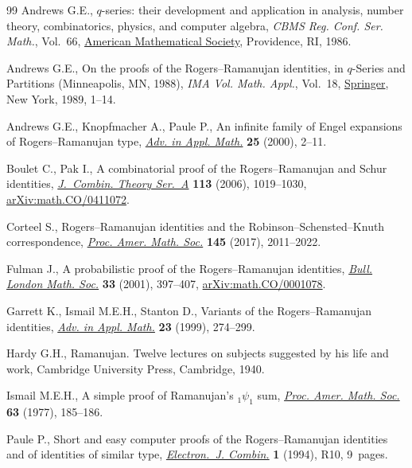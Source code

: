 \documentclass[11pt]{article}
\numberwithin{equation}{section}
\numberwithin{equation}{section}
\begin{document}
\begin{thebibliography}{99}
Andrews G.E., {$q$}-series: their development and application in analysis,
 number theory, combinatorics, physics, and computer algebra, \textit{CBMS
 Reg. Conf. Ser. Math.}, Vol.~66, \href{https://doi.org/10.1090/cbms/066}{American Mathematical Society}, Providence,
 RI, 1986.

Andrews G.E., On the proofs of the {R}ogers--{R}amanujan identities, in
 {$q$}-{S}eries and {P}artitions ({M}inneapolis, {MN}, 1988), \textit{IMA Vol.
 Math. Appl.}, Vol.~18, \href{https://doi.org/10.1007/978-1-4684-0637-5_1}{Springer}, New York, 1989, 1--14.

Andrews G.E., Knopfmacher A., Paule P., An infinite family of {E}ngel
 expansions of {R}ogers--{R}amanujan type, \href{https://doi.org/10.1006/aama.2000.0686}{\textit{Adv. in Appl. Math.}}
 \textbf{25} (2000), 2--11.

Boulet C., Pak I., A combinatorial proof of the {R}ogers--{R}amanujan and
 {S}chur identities, \href{https://doi.org/10.1016/j.jcta.2005.09.007}{\textit{J.~Combin. Theory Ser.~A}} \textbf{113} (2006),
 1019--1030, \href{https://arxiv.org/abs/math.CO/0411072}{arXiv:math.CO/0411072}.

Corteel S., Rogers--{R}amanujan identities and the
 {R}obinson--{S}chensted--{K}nuth correspondence, \href{https://doi.org/10.1090/proc/13373}{\textit{Proc. Amer. Math.
 Soc.}} \textbf{145} (2017), 2011--2022.

Fulman J., A probabilistic proof of the {R}ogers--{R}amanujan identities,
 \href{https://doi.org/10.1017/S0024609301008207}{\textit{Bull. London Math. Soc.}} \textbf{33} (2001), 397--407,
 \href{https://arxiv.org/abs/math.CO/0001078}{arXiv:math.CO/0001078}.

Garrett K., Ismail M.E.H., Stanton D., Variants of the {R}ogers--{R}amanujan
 identities, \href{https://doi.org/10.1006/aama.1999.0658}{\textit{Adv. in Appl. Math.}} \textbf{23} (1999), 274--299.

Hardy G.H., Ramanujan. {T}welve lectures on subjects suggested by his life and
 work, Cambridge University Press, Cambridge, 1940.

Ismail M.E.H., A simple proof of {R}amanujan's {$_{1}\psi_{1}$} sum,
 \href{https://doi.org/10.2307/2041093}{\textit{Proc. Amer. Math. Soc.}} \textbf{63} (1977), 185--186.

Paule P., Short and easy computer proofs of the {R}ogers--{R}amanujan
 identities and of identities of similar type, \href{https://doi.org/10.37236/1190}{\textit{Electron.~J. Combin.}}
 \textbf{1} (1994), R10, 9~pages.


\end{thebibliography}
\end{document}
